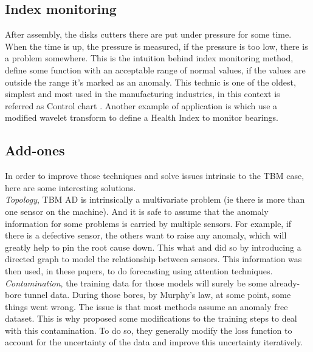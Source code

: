 \documentclass[../../main/main.tex]{subfiles}
\begin{document}
    \subsection{Index monitoring}\label{subsec:indexing}
        After assembly, the disks cutters there are put under pressure for some time. When the time is up, the 
        pressure is measured, if the pressure is too low, there is a problem somewhere. This is the intuition behind index 
        monitoring method, define some function with an acceptable range of normal values, if the values are outside the range 
        it's marked as an anomaly. This technic is one of the oldest, simplest and most used in the manufacturing industries, in
        this context is referred as Control chart \cite{Saleh.01.10.2021}. Another example of application is \cite{Jin.2016} which 
        use a modified wavelet transform to define a Health Index to monitor bearings. 
    
    \subsection{Add-ones}\label{subsec:add_ons}
        In order to improve those techniques and solve issues intrinsic to the TBM case, here are some interesting solutions.\\
        
        \textit{Topology}, TBM AD is intrinsically a multivariate problem (ie there is more than one sensor on the machine).
        And it is safe to assume that the anomaly information for some problems is carried by multiple sensors. For example, if there 
        is a defective sensor, the others want to raise any anomaly, which will greatly help to pin the root cause down. This what 
        \cite{Deng.2021} and \cite{Chen.2021} did so by introducing a directed graph to model the relationship between sensors. This information 
        was then used, in these papers, to do forecasting using attention techniques.\\
        
        \textit{Contamination}, the training data for those models will surely be some already-bore tunnel data. 
        During those bores, by Murphy's law, at some point, some things went wrong. The issue is that most methods assume an anomaly
        free dataset. This is why \cite{Kim.2023} \cite{ChenQiu.2022} \cite{Shang.2023} proposed some modifications to the training steps to deal with this 
        contamination. To do so, they generally modify the loss function to account for the uncertainty of the data and improve 
        this uncertainty iteratively. 
        \\
    
\end{document}
